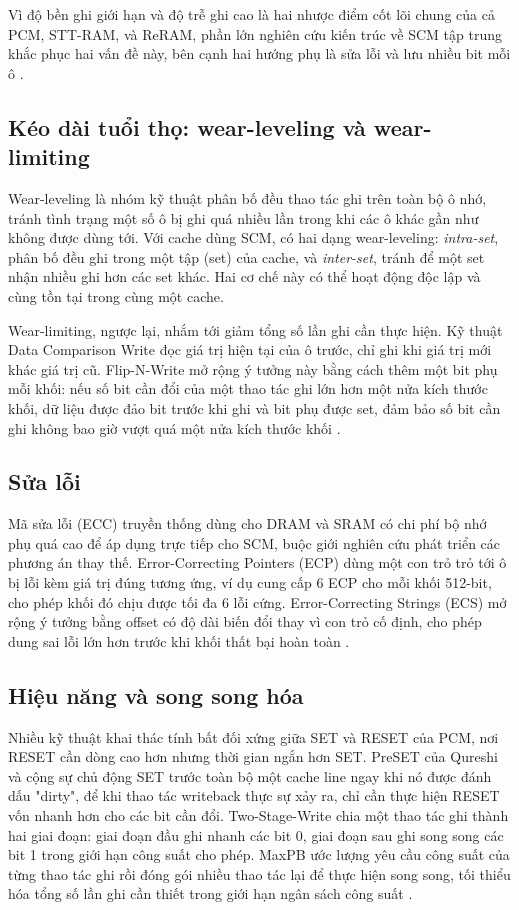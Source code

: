 \documentclass[12pt,a4paper]{article}
\begin{document}
Vì độ bền ghi giới hạn và độ trễ ghi cao là hai nhược điểm cốt lõi chung của cả PCM, STT-RAM, và ReRAM, phần lớn nghiên cứu kiến trúc về SCM tập trung khắc phục hai vấn đề này, bên cạnh hai hướng phụ là sửa lỗi và lưu nhiều bit mỗi ô \cite{kamath2019}.

\subsection{Kéo dài tuổi thọ: wear-leveling và wear-limiting}

Wear-leveling là nhóm kỹ thuật phân bố đều thao tác ghi trên toàn bộ ô nhớ, tránh tình trạng một số ô bị ghi quá nhiều lần trong khi các ô khác gần như không được dùng tới. Với cache dùng SCM, có hai dạng wear-leveling: \textit{intra-set}, phân bố đều ghi trong một tập (set) của cache, và \textit{inter-set}, tránh để một set nhận nhiều ghi hơn các set khác. Hai cơ chế này có thể hoạt động độc lập và cùng tồn tại trong cùng một cache.

Wear-limiting, ngược lại, nhắm tới giảm tổng số lần ghi cần thực hiện. Kỹ thuật Data Comparison Write đọc giá trị hiện tại của ô trước, chỉ ghi khi giá trị mới khác giá trị cũ. Flip-N-Write mở rộng ý tưởng này bằng cách thêm một bit phụ mỗi khối: nếu số bit cần đổi của một thao tác ghi lớn hơn một nửa kích thước khối, dữ liệu được đảo bit trước khi ghi và bit phụ được set, đảm bảo số bit cần ghi không bao giờ vượt quá một nửa kích thước khối \cite{kamath2019}.

\subsection{Sửa lỗi}

Mã sửa lỗi (ECC) truyền thống dùng cho DRAM và SRAM có chi phí bộ nhớ phụ quá cao để áp dụng trực tiếp cho SCM, buộc giới nghiên cứu phát triển các phương án thay thế. Error-Correcting Pointers (ECP) dùng một con trỏ trỏ tới ô bị lỗi kèm giá trị đúng tương ứng, ví dụ cung cấp 6 ECP cho mỗi khối 512-bit, cho phép khối đó chịu được tối đa 6 lỗi cứng. Error-Correcting Strings (ECS) mở rộng ý tưởng bằng offset có độ dài biến đổi thay vì con trỏ cố định, cho phép dung sai lỗi lớn hơn trước khi khối thất bại hoàn toàn \cite{kamath2019}.

\subsection{Hiệu năng và song song hóa}

Nhiều kỹ thuật khai thác tính bất đối xứng giữa SET và RESET của PCM, nơi RESET cần dòng cao hơn nhưng thời gian ngắn hơn SET. PreSET của Qureshi và cộng sự chủ động SET trước toàn bộ một cache line ngay khi nó được đánh dấu "dirty", để khi thao tác writeback thực sự xảy ra, chỉ cần thực hiện RESET vốn nhanh hơn cho các bit cần đổi. Two-Stage-Write chia một thao tác ghi thành hai giai đoạn: giai đoạn đầu ghi nhanh các bit 0, giai đoạn sau ghi song song các bit 1 trong giới hạn công suất cho phép. MaxPB ước lượng yêu cầu công suất của từng thao tác ghi rồi đóng gói nhiều thao tác lại để thực hiện song song, tối thiểu hóa tổng số lần ghi cần thiết trong giới hạn ngân sách công suất \cite{kamath2019}.
\end{document}
